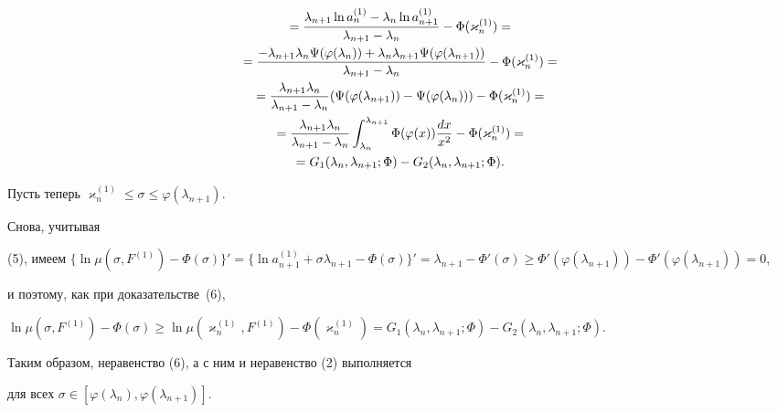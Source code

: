 \begin{pf}
\begin{gather}
%


=\frac{\lambda_{n+1} \ln a^{(1)}_n-\lambda_n\ln a^{(1)}_{n+1}}


{\lambda_{n+1} -\lambda_n}-\Phi(\varkappa^{(1)}_n)=\notag\\


%


=\frac{-\lambda_{n+1}\lambda_n\Psi(\varphi(\lambda_n))+


\lambda_n\lambda_{n+1}\Psi(\varphi(\lambda_{n+1}))}


{\lambda_{n+1} -\lambda_n}-\Phi(\varkappa^{(1)}_n)=\notag\\


%


=\frac{\lambda_{n+1}\lambda_n}{\lambda_{n+1} -\lambda_n}


(\Psi(\varphi(\lambda_{n+1}))-\Psi(\varphi(\lambda_n)))-


\Phi(\varkappa^{(1)}_n)=\notag\\


%


=\frac{\lambda_{n+1}\lambda_n}{\lambda_{n+1} -\lambda_n}


\int_{\lambda_n}^{\lambda_{n+1}}\Phi(\varphi(x))\frac{dx}{x^2}-


\Phi(\varkappa^{(1)}_n)=\notag\\


%


=G_1(\lambda_n,\lambda_{n+1};\Phi)-G_2(\lambda_n,\lambda_{n+1};\Phi).


\end{gather}





Пусть теперь $\varkappa^{(1)}_n\le\sigma\le\varphi(\lambda_{n+1})$.


Снова, учитывая


(5), имеем $\{\ln\mu(\sigma,F^{(1)})-\Phi(\sigma)\}'=


\{\ln a^{(1)}_{n+1}+\sigma\lambda_{n+1}-\Phi(\sigma)\}'=


\lambda_{n+1}-\Phi'(\sigma)\ge\Phi'(\varphi(\lambda_{n+1}))-


\Phi'(\varphi(\lambda_{n+1}))=0$,


и поэтому, как при доказательстве~(6),


$\ln\mu(\sigma,F^{(1)})-\Phi(\sigma)\ge 


\ln\mu(\varkappa^{(1)}_n,F^{(1)})-\Phi(\varkappa^{(1)}_n)=


G_1(\lambda_n,\lambda_{n+1};\Phi)-G_2(\lambda_n,\lambda_{n+1};\Phi)$.        


Таким образом, неравенство (6), а с ним и неравенство (2) выполняется


для всех $\sigma\in [\varphi(\lambda_n),\varphi(\lambda_{n+1})]$.


\end{pf}





